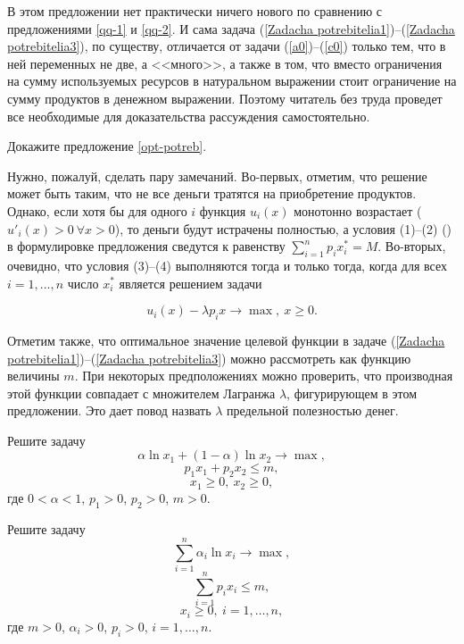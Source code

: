     В этом предложении нет практически ничего нового по сравнению с
    предложениями \ref{qq-1} и \ref{qq-2}. И сама задача
    (\ref{Zadacha potrebitelia1})--(\ref{Zadacha potrebitelia3}),
    по существу, отличается от задачи (\ref{a0})--(\ref{c0})
    только тем, что в ней переменных не две, а <<много>>, а также
    в том, что вместо ограничения на сумму используемых ресурсов в натуральном
    выражении стоит ограничение на сумму продуктов в денежном
    выражении. Поэтому читатель без труда проведет все
    необходимые для доказательства рассуждения самостоятельно.
\begin{exer}
    Докажите предложение \ref{opt-potreb}.
\end{exer}



    Нужно, пожалуй, сделать пару замечаний. Во-первых, отметим, что
     решение может быть таким, что не все деньги тратятся
    на приобретение продуктов. Однако, если хотя бы для одного
    $i$ функция $u_{i}(x)$ монотонно
    возрастает ($u'_{i}(x)>0 \ \forall x>0$), то деньги
    будут истрачены полностью, а условия (1)--(2)
    () в формулировке
    предложения сведутся к равенству
    $\sum_{i=1}^{n}p_{i}x^{*}_{i}=M$.
    Во-вторых, очевидно, что условия (3)--(4) выполняются
    тогда и только тогда, когда для всех $i=1,\ldots,n$ число
    $x^{*}_{i}$ является решением задачи

    \[u_{i}(x)-\lambda p_{i}x\rightarrow\max, \ x\geqslant0.\]

    Отметим также, что оптимальное значение целевой функции
    в задаче (\ref{Zadacha potrebitelia1})--(\ref{Zadacha potrebitelia3})
    можно рассмотреть
    как функцию величины $m$. При некоторых предположениях можно
    проверить, что производная этой функции совпадает с множителем Лагранжа
    $\lambda$, фигурирующем в этом предложении.
    Это дает повод назвать $\lambda$ предельной полезностью денег.

\begin{exer}
    \label{Kobb-Douglas1}

    Решите задачу
\[\alpha \ln x_{1}+(1-\alpha)\ln x_{2}\rightarrow\max,\]
\[p_{1}x_{1}+p_{2}x_{2}\leqslant m,\]
\[x_{1}\geqslant0,\ x_{2}\geqslant0,\]
    где $0<\alpha<1$, $p_{1}>0$, $p_{2}>0$, $m>0$.

\end{exer}




\begin{exer}
    \label{Kobb-Douglas2}

    Решите задачу
\[\sum_{i=1}^{n}\alpha_{i}\ln x_{i}\rightarrow\max,\]
\[\sum_{i=1}^{n}p_{i}x_{i}\leqslant m,\]
\[x_{i}\geqslant0,\ i=1,\ldots,n,\]
где $m>0$, $\alpha_{i}>0$, $p_{i}>0$, $i=1,\ldots,n$.

\end{exer}


